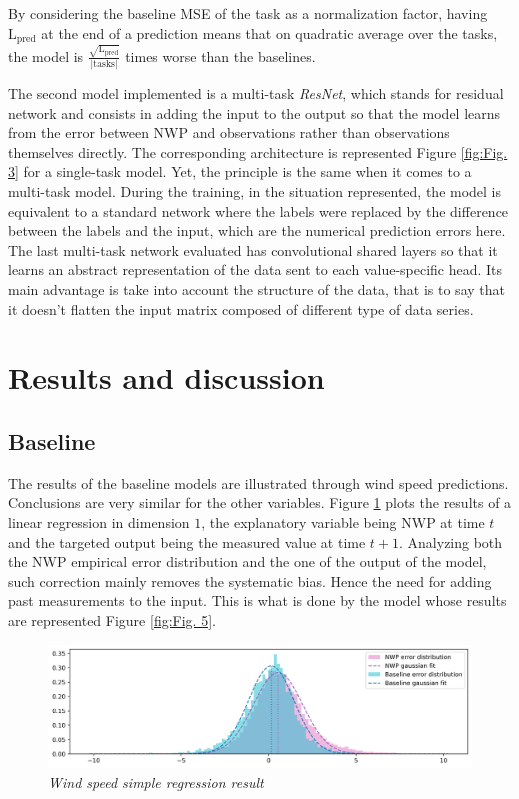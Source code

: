 \documentclass{article}
\newcommand{\saut}{\vspace{10px}}
\begin{document}
By considering the baseline MSE of the task as a normalization factor, having $\mathrm L_{\mathrm{pred}}$ at
the end of a prediction means that on quadratic average over the tasks, the model is
$\frac{\sqrt{\mathrm L_{\mathrm{pred}}}}{| \mathrm{tasks} | }$ times worse than the baselines.

\saut

The second model implemented is a multi-task \emph{ResNet}, which stands for residual network and consists in adding
the input to the output so that the model learns from the error between NWP and observations rather than observations
themselves directly. The corresponding architecture is represented Figure \ref{fig:Fig. 3} for a single-task model. Yet,
the principle is the same when it comes to a multi-task model. During the training, in the situation represented,
the model is equivalent to a standard network where the labels were replaced by the difference between the
labels and the input, which are the numerical prediction errors here.
The last multi-task network evaluated has convolutional shared layers so that it learns an abstract representation of the
data sent to each value-specific head. Its main advantage is take into account the structure of the data, that is to say
that it doesn't flatten the input matrix composed of different type of data series.

\section{Results and discussion}
\subsection*{Baseline}

The results of the baseline models are illustrated through wind speed predictions. Conclusions are very similar
for the other variables. Figure \ref{fig:Fig. 4} plots the results of a linear regression in dimension $1$, the explanatory
variable being NWP at time $t$ and the targeted output being the measured value at time $t + 1$. Analyzing both
the NWP empirical error distribution and the one of the
output of the model, such correction mainly removes the systematic bias.
Hence the need for adding past measurements to the input. This is what is done by the model whose results
are represented Figure \ref{fig:Fig. 5}.


\begin{figure}[H]
    \centering
    \includegraphics[width=\linewidth]{img/base.png}
    \caption{\textit{Wind speed simple regression result}}
    \label{fig:Fig. 4}
\end{figure}
\end{document}
